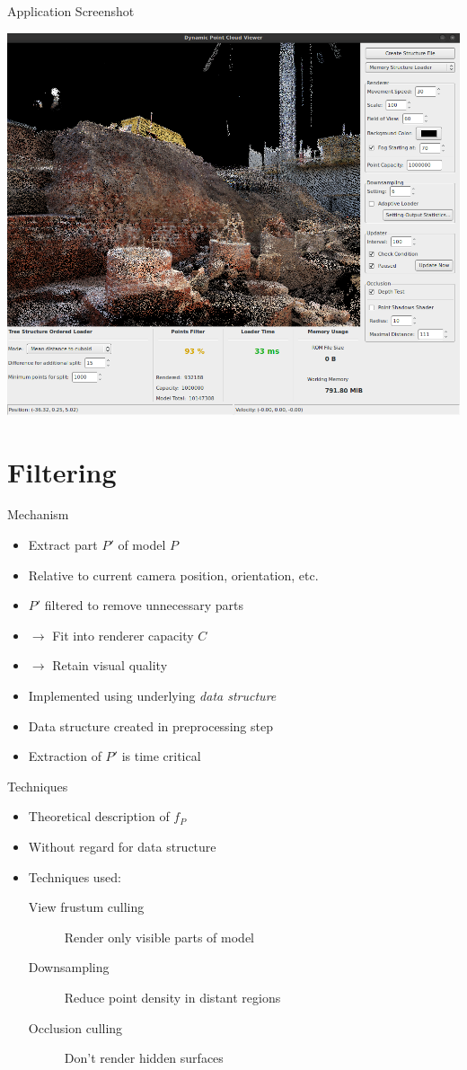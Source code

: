 \documentclass{beamer}
\begin{document}
\begin{frame}{Application Screenshot}
	\begin{center}
	\includegraphics[width=.8\textwidth]{screenshot.png}
	\end{center}
\end{frame}

\section{Filtering}

\begin{frame}{Mechanism}
	\begin{itemize}
	\item Extract part $P'$ of model $P$
	\item Relative to current camera position, orientation, etc.
	\item $P'$ filtered to remove unnecessary parts
	\item $\rightarrow$ Fit into renderer capacity $C$
	\item $\rightarrow$ Retain visual quality
	\item Implemented using underlying \emph{data structure}
	\item Data structure created in preprocessing step
	\item Extraction of $P'$  is time critical
	\end{itemize}
\end{frame}

\begin{frame}{Techniques}
	\begin{itemize}
	\item Theoretical description of $f_{P}$
	\item Without regard for data structure
	\item Techniques used:
		\begin{description}
		\item[View frustum culling] Render only visible parts of model
		\item[Downsampling] Reduce point density in distant regions
		\item[Occlusion culling] Don't render hidden surfaces
		\end{description}
	\end{itemize}
\end{frame}
\end{document}
